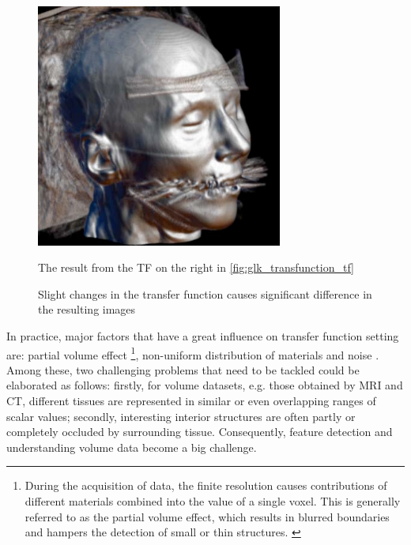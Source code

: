 \begin{figure}
\begin{minipage}{0.25\textwidth}
        \end{minipage}~
        ~ %
        \begin{minipage}{0.25\textwidth}
                \centering
                \includegraphics[width=1\linewidth]{images/glk_transfunction_2.png}
                \caption{The result from the TF on the right in \ref{fig:glk_transfunction_tf}}
                \label{fig:glk_transfunction_2}
        \end{minipage}    
        \caption{Slight changes in the transfer function causes significant difference in the resulting images \cite{kindlmann_transfer_2002}}
        \label{fig:multiple_glk_transfunction}
\end{figure}

In practice, major factors that have a great influence on transfer function setting are: partial volume effect \footnote{During the acquisition of data, the finite resolution causes contributions of different materials combined into the value of a single voxel. This is generally referred to as the partial volume effect, which results in blurred boundaries and hampers the detection of small or thin structures. \cite{serlie_classifying_2007}}, non-uniform distribution of materials and noise \cite{serlie_computed_2003}.
Among these, two challenging problems that need to be tackled could be elaborated as follows: firstly, for volume datasets, e.g. those obtained by MRI and CT, different tissues are represented in similar or even overlapping ranges of scalar values; secondly, interesting interior structures are often partly or completely occluded by surrounding tissue.
Consequently, feature detection and understanding volume data become a big challenge.

